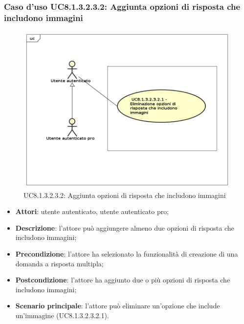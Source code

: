 \subsubsection{Caso d'uso UC8.1.3.2.3.2: Aggiunta opzioni di risposta che includono immagini}
	\label{UC8.1.3.2.3.2}
	\begin{figure}[h]
		\centering
			\includegraphics[scale=0.45,keepaspectratio]{UML/UC8_1_3_2_3_2.png}
		\caption{UC8.1.3.2.3.2:  Aggiunta opzioni di risposta che includono immagini}
	\end{figure}	
	\FloatBarrier
	\begin{itemize}
		\item
			\textbf{Attori}: utente autenticato, utente autenticato pro;
		\item		
			\textbf{Descrizione}: l'attore può aggiungere almeno due opzioni di risposta che includono immagini;
		\item
			\textbf{Precondizione}: l'attore ha selezionato la funzionalità di creazione di una domanda a risposta multipla;
		\item
			\textbf{Postcondizione}: l'attore ha aggiunto due o più opzioni di risposta che includono immagini;
		\item
			\textbf{Scenario principale}: l'attore può eliminare un'opzione che include un'immagine (UC8.1.3.2.3.2.1). 				
	\end{itemize}
	
